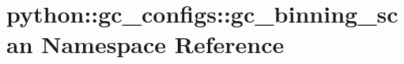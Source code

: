\hypertarget{namespacepython_1_1gc__configs_1_1gc__binning__scan}{
\section{python::gc\_\-configs::gc\_\-binning\_\-scan Namespace Reference}
\label{namespacepython_1_1gc__configs_1_1gc__binning__scan}
}
